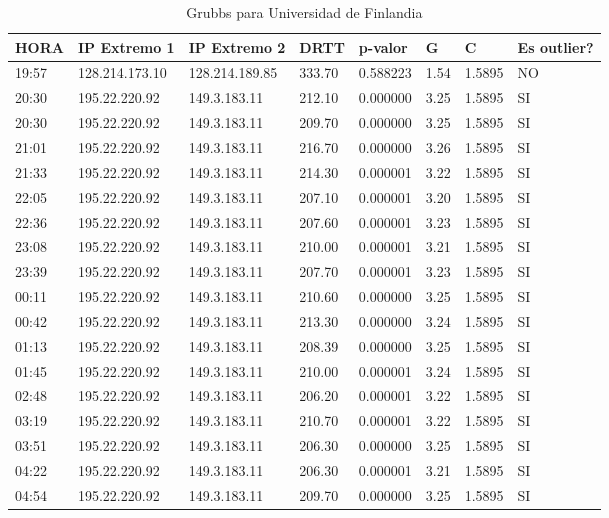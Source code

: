 \begin{table}[H]
	\centering
	\caption{Grubbs para Universidad de Finlandia}
	\label{table:grubbs-finlandia}
	\begin{tabular}{|l|l|l|l|l|l|l|l|}
		\hline
		HORA & IP Extremo 1 & IP Extremo 2 & DRTT & p-valor & G & C & Es outlier? \\ \hline 
		19:57 & 128.214.173.10 & 128.214.189.85 & 333.70 & 0.588223 & 1.54 & 1.5895 & NO \\ \hline
		20:30 & 195.22.220.92 & 149.3.183.11 & 212.10 & 0.000000 & 3.25 & 1.5895 & SI \\ \hline
		20:30 & 195.22.220.92 & 149.3.183.11 & 209.70 & 0.000000 & 3.25 & 1.5895 & SI \\ \hline
		21:01 & 195.22.220.92 & 149.3.183.11 & 216.70 & 0.000000 & 3.26 & 1.5895 & SI \\ \hline
		21:33 & 195.22.220.92 & 149.3.183.11 & 214.30 & 0.000001 & 3.22 & 1.5895 & SI \\ \hline
		22:05 & 195.22.220.92 & 149.3.183.11 & 207.10 & 0.000001 & 3.20 & 1.5895 & SI \\ \hline
		22:36 & 195.22.220.92 & 149.3.183.11 & 207.60 & 0.000001 & 3.23 & 1.5895 & SI \\ \hline
		23:08 & 195.22.220.92 & 149.3.183.11 & 210.00 & 0.000001 & 3.21 & 1.5895 & SI \\ \hline
		23:39 & 195.22.220.92 & 149.3.183.11 & 207.70 & 0.000001 & 3.23 & 1.5895 & SI \\ \hline
		00:11 & 195.22.220.92 & 149.3.183.11 & 210.60 & 0.000000 & 3.25 & 1.5895 & SI \\ \hline
		00:42 & 195.22.220.92 & 149.3.183.11 & 213.30 & 0.000000 & 3.24 & 1.5895 & SI \\ \hline
		01:13 & 195.22.220.92 & 149.3.183.11 & 208.39 & 0.000000 & 3.25 & 1.5895 & SI \\ \hline
		01:45 & 195.22.220.92 & 149.3.183.11 & 210.00 & 0.000001 & 3.24 & 1.5895 & SI \\ \hline
		02:48 & 195.22.220.92 & 149.3.183.11 & 206.20 & 0.000001 & 3.22 & 1.5895 & SI \\ \hline
		03:19 & 195.22.220.92 & 149.3.183.11 & 210.70 & 0.000001 & 3.22 & 1.5895 & SI \\ \hline
		03:51 & 195.22.220.92 & 149.3.183.11 & 206.30 & 0.000000 & 3.25 & 1.5895 & SI \\ \hline
		04:22 & 195.22.220.92 & 149.3.183.11 & 206.30 & 0.000001 & 3.21 & 1.5895 & SI \\ \hline
		04:54 & 195.22.220.92 & 149.3.183.11 & 209.70 & 0.000000 & 3.25 & 1.5895 & SI \\ \hline

\end{tabular}
\end{table}
